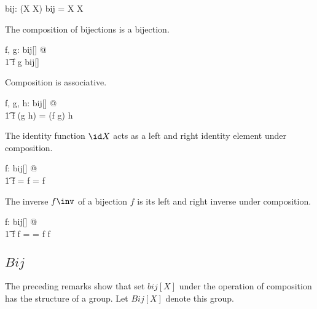 \documentclass[11pt, oneside]{article}
\begin{document}
\begin{gendef}[X]
	bij: \power(X \fun X)
\where
	bij = X \bij X
\end{gendef}

\begin{remark}
The composition of bijections is a bijection.

\begin{zed}
	\forall f, g: bij[\setX] @ \\
	\t1	f \circ g \in bij[\setX]
\end{zed}

\end{remark}

\begin{remark}
Composition is associative.

\begin{zed}
	\forall f, g, h: bij[\setX] @ \\
	\t1	f \circ (g \circ h) = (f \circ g) \circ h
\end{zed}

\end{remark}

\begin{remark}
The identity function $\id X$ acts as a left and right identity element under composition.

\begin{zed}
	\forall f: bij[\setX] @ \\
	\t1	 \id \setX \circ f = f = f \circ \id \setX
\end{zed}

\end{remark}

\begin{remark}
The inverse $f \inv$ of a bijection $f$ is its left and right inverse under composition.

\begin{zed}
	\forall f: bij[\setX] @ \\
	\t1	f \circ f \inv = \id \setX = f \inv \circ f
\end{zed}

\end{remark}

\subsection{$Bij$}

The preceding remarks show that set $bij[X]$ under the operation of composition has the structure of a group.
Let $Bij[X]$ denote this group.
\end{document}

